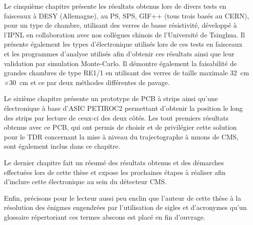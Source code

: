 Le cinquième chapitre présente les résultats obtenus lors de divers tests en faisceaux à DESY (Allemagne), au PS, SPS, GIF++ (tous trois basés au CERN), pour un type de chambre, utilisant des verres de basse résistivité, développé à l'IPNL en collaboration avec nos collègues chinois de l'Université de Tsinghua. Il présente également les types d'électronique utilisés lors de ces tests en faisceaux et les programmes d'analyse utilisés afin d'obtenir ces résultats ainsi que leur validation par simulation Monte-Carlo. Il démontre également la faisabilité de grandes chambres de type RE1/1 en utilisant des verres de taille maximale \SI{32}{\centi\meter}$\times$\SI{30}{\centi\meter} et ce par deux méthodes différentes de pavage.

Le sixième chapitre présente un prototype de PCB à strips ainsi qu'une électronique à base d'ASIC PETIROC2 permettant d'obtenir la position le long des strips par lecture de ceux-ci des deux côtés. Les tout premiers résultats obtenus avec ce PCB, qui ont permis de choisir et de privilégier cette solution pour le TDR concernant la mise à niveau du trajectographe à muons de CMS, sont également inclus dans ce chapitre.

Le dernier chapitre fait un résumé des résultats obtenus et des démarches effectuées lors de cette thèse et expose les prochaines étapes à réaliser afin d'inclure cette électronique au sein du détecteur CMS.

Enfin, précisons pour le lecteur aussi peu enclin que l'auteur de cette thèse à la résolution des énigmes engendrées par l'utilisation de sigles  et d'acronymes qu'un glossaire répertoriant ces termes abscons est placé en fin d'ouvrage.


